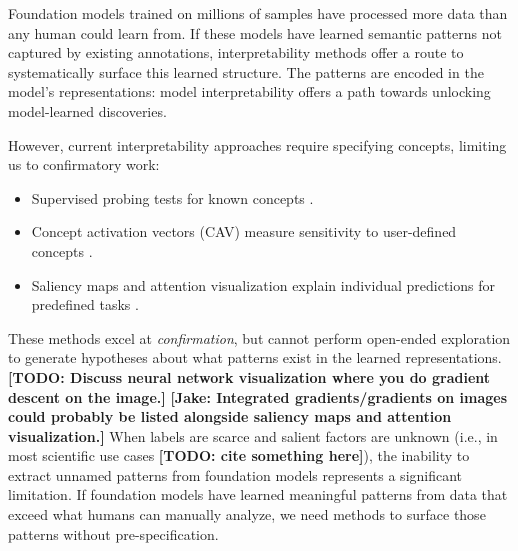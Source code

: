 \documentclass[10pt,twocolumn,letterpaper]{article}
\newcommand{\todo}[1]{\textbf{\color{red}[TODO: #1]}}
\newcommand{\jake}[1]{\textbf{\color{green}[Jake: #1]}}
\begin{document}
Foundation models trained on millions of samples have processed more data than any human could learn from.
If these models have learned semantic patterns not captured by existing annotations, interpretability methods offer a route to systematically surface this learned structure.
The patterns are encoded in the model's representations: model interpretability offers a path towards unlocking model-learned discoveries.

However, current interpretability approaches require specifying concepts, limiting us to confirmatory work:
\begin{itemize}
\item{Supervised probing tests for known concepts \citep{alain2016understanding}.}
\item{Concept activation vectors (CAV) measure sensitivity to user-defined concepts \citep{kim2018tcav}.}
\item{Saliency maps and attention visualization explain individual predictions for predefined tasks \citep{selvaraju2017gradcam,simonyan2013deep}.}
\end{itemize}
These methods excel at \textit{confirmation}, but cannot perform open-ended exploration to generate hypotheses about what patterns exist in the learned representations.
\todo{Discuss neural network visualization where you do gradient descent on the image.} \jake{Integrated gradients/gradients on images could probably be listed alongside saliency maps and attention visualization.}
When labels are scarce and salient factors are unknown (i.e., in most scientific use cases \todo{cite something here}), the inability to extract unnamed patterns from foundation models represents a significant limitation.
If foundation models have learned meaningful patterns from data that exceed what humans can manually analyze, we need methods to surface those patterns without pre-specification.
\end{document}

